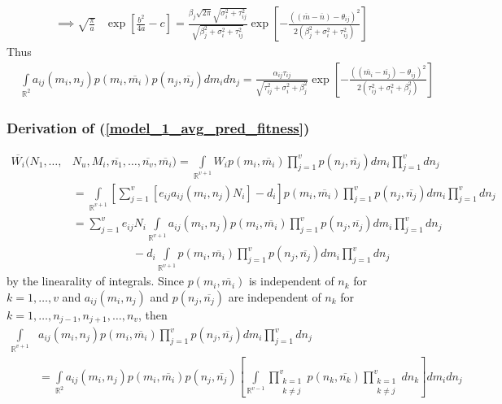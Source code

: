 \documentclass{amsart}
\theoremstyle{definition}
\theoremstyle{remark}
\numberwithin{equation}{section}
\begin{document}
\begin{align*}
	\implies \sqrt{\frac{\pi}{a}}&\exp\left[\frac{b^2}{4a} - c\right] = \frac{\beta_j\sqrt{2\pi}\sqrt{\sigma_i^2 + \tau_{ij}^2}}{\sqrt{\beta_j^2 + \sigma_i^2 + \tau_{ij}^2}}\exp\left[-\frac{((\overline{m} - \overline{n}) - \theta_{ij})^2}{2(\beta_j^2 + \sigma_i^2 + \tau_{ij}^2)}\right]
\end{align*}
Thus
\begin{align*}
	&\int\limits_{\mathbb{R}^2}a_{ij}(m_i, n_j)p(m_i, \overline{m_i})p(n_j, \overline{n_j})dm_idn_j = \frac{\alpha_{ij}\tau_{ij}}{\sqrt{\tau_{ij}^2 + \sigma_i^2 + \beta_j^2}}\exp{\left[-\frac{((\overline{m_i} - \overline{n_j}) - \theta_{ij})^2}{2(\tau_{ij}^2 + \sigma_i^2 + \beta_j^2)}\right]}
\end{align*}
\subsubsection{Derivation of (\ref{model_1_avg_pred_fitness})}
\begin{align*}
	\overline{W_i}(N_1, \dots, &N_u, M_i, \overline{n_1}, \dots, \overline{n_v}, \overline{m_i}) = \int\limits_{\mathbb{R}^{v+1}}^{}W_ip(m_i, \overline{m_i})\prod\limits_{j = 1}^{v}p(n_j, \overline{n_j})dm_i\prod\limits_{j = 1}^{v}dn_j \\
	&= \int\limits_{\mathbb{R}^{v+1}}^{}\left[\sum\limits_{j = 1}^{v}\left[e_{ij}a_{ij}(m_i, n_j)N_i\right] - d_i\right]p(m_i, \overline{m_i})\prod\limits_{j = 1}^{v}p(n_j, \overline{n_j})dm_i\prod\limits_{j = 1}^{v}dn_j \\
	&= \sum_{j=1}^{v}e_{ij}N_i\int\limits_{\mathbb{R}^{v+1}}^{}a_{ij}(m_i, n_j)p(m_i, \overline{m_i})\prod\limits_{j = 1}^{v}p(n_j, \overline{n_j})dm_i\prod\limits_{j = 1}^{v}dn_j \\
	&\ \ \ \ \ \ \ \ \ \ \ \ \ \ \ \ \ \ \ \ \ \ \ \ - d_i\int\limits_{\mathbb{R}^{v+1}}p(m_i, \overline{m_i})\prod\limits_{j = 1}^{v}p(n_j, \overline{n_j})dm_i\prod\limits_{j = 1}^{v}dn_j
\end{align*}
by the linearality of integrals.  Since $p(m_i, \overline{m_i})$ is independent of $n_k$ for $k = 1, \dots, v$ and $a_{ij}(m_i, n_j)$ and $p(n_j, \overline{n_j})$ are independent of $n_k$ for $k = 1, \dots, n_{j-1}, n_{j+1}, \dots, n_v$, then
\begin{align*}
	\int\limits_{\mathbb{R}^{v+1}}^{}&a_{ij}(m_i, n_j)p(m_i, \overline{m_i})\prod\limits_{j = 1}^{v}p(n_j, \overline{n_j})dm_i\prod\limits_{j = 1}^{v}dn_j \\
	&= \int\limits_{\mathbb{R}^2}a_{ij}(m_i, n_j)p(m_i, \overline{m_i})p(n_j, \overline{n_j})\left[\int\limits_{\mathbb{R}^{v-1}}\prod\limits_{\substack{k=1\\k\neq j}}^{v}p(n_k, \overline{n_k})\prod\limits_{\substack{k=1\\k\neq j}}^{v}dn_k\right]dm_idn_j
\end{align*}
\end{document}
